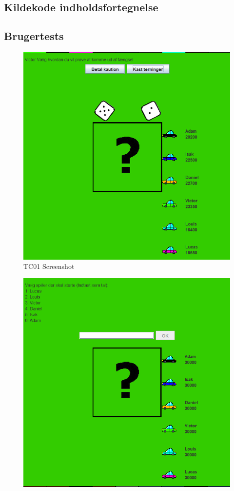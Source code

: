 \begin{flushleft}
\subsection{Kildekode indholdsfortegnelse}
\subsection{Brugertests}
\begin{figure}[H] %
    \centering
    \includegraphics[width=16cm]{Report/figures/Usertests/BilagTC01.png}
    \caption{TC01 Screenshot}
    \label{TC01Bilag}
\end{figure}\begin{figure}[H] %
    \centering
    \includegraphics[width=16cm]{Report/figures/Usertests/BilagTC02.png}

\end{figure}
\end{flushleft}
